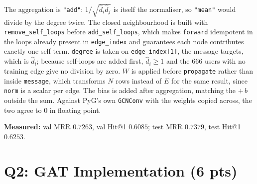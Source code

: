 \noindent
The aggregation is \texttt{"add"}: $1/\sqrt{\hat d_i \hat d_j}$ is itself the
normaliser, so \texttt{"mean"} would divide by the degree twice. The closed
neighbourhood is built with \texttt{remove\_self\_loops} before
\texttt{add\_self\_loops}, which makes \texttt{forward} idempotent in the loops
already present in \texttt{edge\_index} and guarantees each node contributes exactly
one self term. \texttt{degree} is taken on \texttt{edge\_index[1]}, the message
targets, which is $\hat d_i$; because self-loops are added first, $\hat d_i \ge 1$ and
the 666 users with no training edge give no division by zero. $W$ is applied before
\texttt{propagate} rather than inside \texttt{message}, which transforms $N$ rows
instead of $E$ for the same result, since \texttt{norm} is a scalar per edge. The bias
is added after aggregation, matching the $+\,b$ outside the sum. Against PyG's own
\texttt{GCNConv} with the weights copied across, the two agree to $0$ in floating point.

\medskip\noindent
\textbf{Measured:} val MRR $0.7263$, val Hit@1 $0.6085$; test MRR $0.7379$,
test Hit@1 $0.6253$.

\section*{Q2: GAT Implementation (6 pts)}

